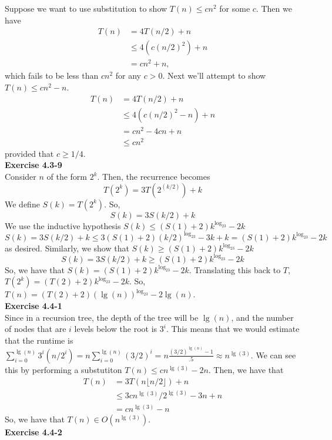 \documentclass{article}
\begin{document}
Suppose we want to use substitution to show $T(n) \leq cn^2$ for some $c$.  Then we have
\begin{align*}
T(n) &= 4T(n/2) + n \\
&\leq 4(c(n/2)^2) + n \\
&= cn^2 + n,
\end{align*}
which fails to be less than $cn^2$ for any $c > 0$.  Next we'll attempt to show $T(n) \leq cn^2 - n$.
\begin{align*}
T(n)&= 4T(n/2) + n\\
& \leq 4(c(n/2)^2 - n) + n \\
&= cn^2 - 4cn + n \\
&\leq cn^2 
\end{align*}
provided that $c \geq 1/4$.  \\

\noindent\textbf{Exercise 4.3-9}\\

Consider $n$ of the form $2^k$. Then, the recurrence becomes
\[
T(2^k) = 3 T(2^(k/2)) +k
\]
We define $S(k) = T(2^k)$. So,
\[
S(k) =3S(k/2)+k
\]
We use the inductive hypothesis $S(k)\le (S(1)+2) k^{\log_23} - 2k$
\[
S(k) = 3S(k/2)+k \le 3(S(1)+2)(k/2)^{\log_23} -3k+k = (S(1)+2)k^{\log_23} - 2k
\]
as desired. Similarly, we show that $S(k) \ge (S(1)+2) k^{\log_23} -2k$
\[
S(k) = 3S(k/2) +k \ge (S(1)+2)k^{\log_23} -2k
\]
So, we have that $S(k) = (S(1)+2)k^{\log_23}-2k$. Translating this back to $T$, $T(2^k) = (T(2)+2) k^{\log_23} -2k$. So, $T(n) = (T(2)+2)(\lg(n))^{\log_23} - 2\lg(n)$.\\

\noindent\textbf{Exercise 4.4-1}\\

Since in a recursion tree, the depth of the tree will be $\lg(n)$, and the number of nodes that are $i$ levels below the root is $3^i$. This means that we would estimate that the runtime is $\sum_{i=0}^{\lg(n)} 3^i (n/2^i) = n \sum_{i=0}^{\lg(n)} (3/2)^i = n \frac{(3/2)^{\lg(n)}-1}{.5} \approx n^{\lg(3)}$. We can see this by performing a substutiton $T(n) \le c n^{\lg(3)} -2 n$. Then, we have that 
\begin{align*}
T(n)&= 3T(n\lfloor n/2\rfloor) + n \\
&\le 3cn^{\lg(3)}/2^{\lg(3)} - 3n +n\\
&= cn^{\lg(3)} -n
\end{align*}
So, we have that $T(n)\in O(n^{\lg(3)})$.\\

\noindent\textbf{Exercise 4.4-2}\\
\end{document}
